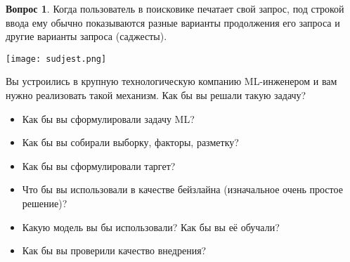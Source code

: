 \documentclass[12pt]{article}
\theoremstyle{definition}
\newtheorem{question}{Вопрос}
\begin{document}
\begin{question}
Когда пользователь в поисковике печатает свой запрос, под строкой ввода ему обычно показываются разные варианты продолжения его запроса и другие варианты запроса (саджесты).  

\begin{center} 
    \texttt{[image: sudjest.png]} 
\end{center}

Вы устроились в крупную технологическую компанию ML-инженером и вам нужно реализовать такой механизм. Как бы вы решали такую задачу? 

\begin{itemize} 
    \item Как бы вы сформулировали задачу ML? 
    \item Как бы вы собирали выборку, факторы, разметку? 
    \item Как бы вы сформулировали таргет? 
    \item Что бы вы использовали в качестве бейзлайна (изначальное очень простое решение)? 
    \item Какую модель вы бы использовали? Как бы вы её обучали? 
    \item Как бы вы проверили качество внедрения? 
\end{itemize} 
\end{question}
\end{document}
